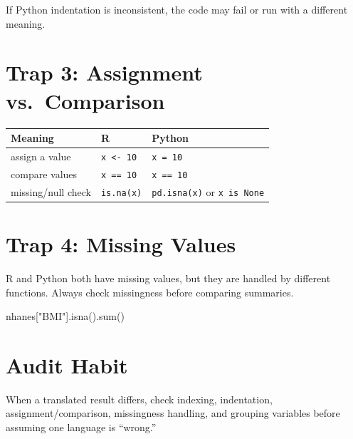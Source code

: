 \documentclass[
  letterpaper,
  DIV=11,
  numbers=noendperiod,
  oneside]{scrreprt}
\newenvironment{Shaded}{\begin{snugshade}}{\end{snugshade}}
\newcommand{\BuiltInTok}[1]{\textcolor[rgb]{0.00,0.23,0.31}{#1}}
\newcommand{\FunctionTok}[1]{\textcolor[rgb]{0.28,0.35,0.67}{#1}}
\newcommand{\NormalTok}[1]{\textcolor[rgb]{0.00,0.23,0.31}{#1}}
\newcommand{\SpecialCharTok}[1]{\textcolor[rgb]{0.37,0.37,0.37}{#1}}
\newcommand{\StringTok}[1]{\textcolor[rgb]{0.13,0.47,0.30}{#1}}
\begin{document}
If Python indentation is inconsistent, the code may fail or run with a
different meaning.

\section{Trap 3: Assignment
vs.~Comparison}\label{trap-3-assignment-vs.-comparison}

\begin{longtable}[]{@{}lll@{}}
\toprule\noalign{}
Meaning & R & Python \\
\midrule\noalign{}
\endhead
\bottomrule\noalign{}
\endlastfoot
assign a value & \texttt{x\ \textless{}-\ 10} & \texttt{x\ =\ 10} \\
compare values & \texttt{x\ ==\ 10} & \texttt{x\ ==\ 10} \\
missing/null check & \texttt{is.na(x)} & \texttt{pd.isna(x)} or
\texttt{x\ is\ None} \\
\end{longtable}

\section{Trap 4: Missing Values}\label{trap-4-missing-values}

R and Python both have missing values, but they are handled by different
functions. Always check missingness before comparing summaries.

\begin{Shaded}
\end{Shaded}

\begin{Shaded}
\begin{Highlighting}[numbers=left,,]
\NormalTok{nhanes[}\StringTok{"BMI"}\NormalTok{].isna().}\BuiltInTok{sum}\NormalTok{()}
\end{Highlighting}
\end{Shaded}

\section{Audit Habit}\label{audit-habit}

When a translated result differs, check indexing, indentation,
assignment/comparison, missingness handling, and grouping variables
before assuming one language is ``wrong.''
\end{document}
